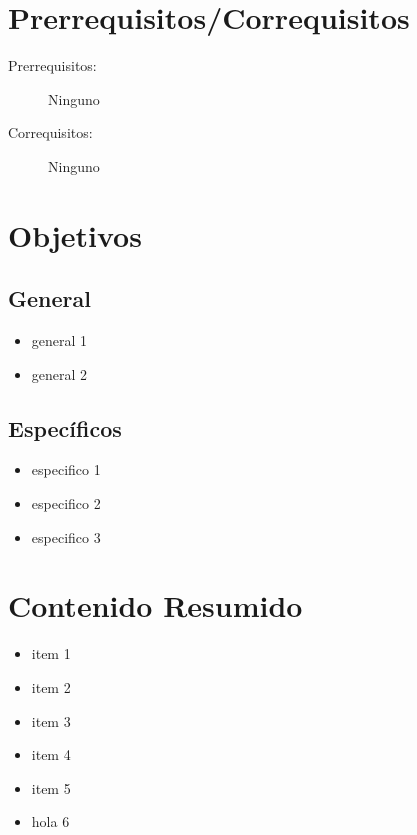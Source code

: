 \documentclass[11pt]{article}
\begin{document}
\section*{Prerrequisitos/Correquisitos}
\begin{description}
\item [Prerrequisitos:] Ninguno
\item[Correquisitos:] Ninguno
\end{description}

\section*{Objetivos}

\subsection*{General}

\begin{itemize}
\item general 1 \item general 2  
\end{itemize}

\subsection*{Específicos}

\begin{itemize}
\item especifico 1 \item especifico 2  \item especifico 3  
\end{itemize}

\section*{Contenido Resumido}

\begin{itemize}
\item item 1 \item  item 2  \item  item 3  \item  item 4  \item  item 5  \item hola 6 
\end{itemize}
\end{document}
